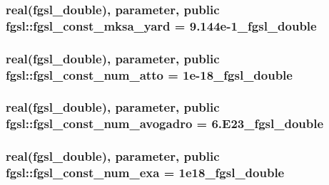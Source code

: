 \subsubsection[{fgsl\+\_\+const\+\_\+mksa\+\_\+yard}]{\setlength{\rightskip}{0pt plus 5cm}real({\bf fgsl\+\_\+double}), parameter, public fgsl\+::fgsl\+\_\+const\+\_\+mksa\+\_\+yard = 9.\+144e-\/1\+\_\+fgsl\+\_\+double}\label{namespacefgsl_a822a621129f787917e82b140d0814b72}
\hypertarget{namespacefgsl_aca23ff810481681a4329c406eb3c4bbc}{}
\subsubsection[{fgsl\+\_\+const\+\_\+num\+\_\+atto}]{\setlength{\rightskip}{0pt plus 5cm}real({\bf fgsl\+\_\+double}), parameter, public fgsl\+::fgsl\+\_\+const\+\_\+num\+\_\+atto = 1e-\/18\+\_\+fgsl\+\_\+double}\label{namespacefgsl_aca23ff810481681a4329c406eb3c4bbc}
\hypertarget{namespacefgsl_a009cf79cdb578326cbceea51aa302e53}{}
\subsubsection[{fgsl\+\_\+const\+\_\+num\+\_\+avogadro}]{\setlength{\rightskip}{0pt plus 5cm}real({\bf fgsl\+\_\+double}), parameter, public fgsl\+::fgsl\+\_\+const\+\_\+num\+\_\+avogadro = 6.\+E23\+\_\+fgsl\+\_\+double}\label{namespacefgsl_a009cf79cdb578326cbceea51aa302e53}
\hypertarget{namespacefgsl_a0d6878f336ffcf4aaf3af66bbdfc5a9b}{}
\subsubsection[{fgsl\+\_\+const\+\_\+num\+\_\+exa}]{\setlength{\rightskip}{0pt plus 5cm}real({\bf fgsl\+\_\+double}), parameter, public fgsl\+::fgsl\+\_\+const\+\_\+num\+\_\+exa = 1e18\+\_\+fgsl\+\_\+double}\label{namespacefgsl_a0d6878f336ffcf4aaf3af66bbdfc5a9b}
\hypertarget{namespacefgsl_a3ab8d745c9129ec33f7556e68234b60b}{}
